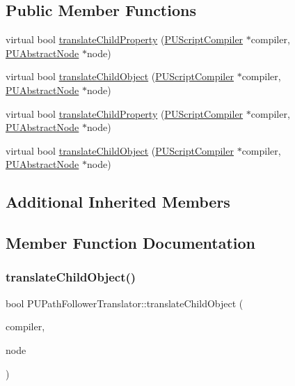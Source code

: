 \subsection*{Public Member Functions}
\begin{DoxyCompactItemize}
\item 
virtual bool \hyperlink{classPUPathFollowerTranslator_a586fc96a69d8ec7915960b1cdb4e35e2}{translate\+Child\+Property} (\hyperlink{classPUScriptCompiler}{P\+U\+Script\+Compiler} $\ast$compiler, \hyperlink{classPUAbstractNode}{P\+U\+Abstract\+Node} $\ast$node)
\item 
virtual bool \hyperlink{classPUPathFollowerTranslator_a13efff0a2d095b443d6fe967d4eb8d96}{translate\+Child\+Object} (\hyperlink{classPUScriptCompiler}{P\+U\+Script\+Compiler} $\ast$compiler, \hyperlink{classPUAbstractNode}{P\+U\+Abstract\+Node} $\ast$node)
\item 
virtual bool \hyperlink{classPUPathFollowerTranslator_a5628c773dc8c5a80074467e4237e4760}{translate\+Child\+Property} (\hyperlink{classPUScriptCompiler}{P\+U\+Script\+Compiler} $\ast$compiler, \hyperlink{classPUAbstractNode}{P\+U\+Abstract\+Node} $\ast$node)
\item 
virtual bool \hyperlink{classPUPathFollowerTranslator_a6ed9a908748902c9e33d3b87673de713}{translate\+Child\+Object} (\hyperlink{classPUScriptCompiler}{P\+U\+Script\+Compiler} $\ast$compiler, \hyperlink{classPUAbstractNode}{P\+U\+Abstract\+Node} $\ast$node)
\end{DoxyCompactItemize}
\subsection*{Additional Inherited Members}


\subsection{Member Function Documentation}
\mbox{\label{classPUPathFollowerTranslator_a13efff0a2d095b443d6fe967d4eb8d96}} 
\subsubsection{\texorpdfstring{translate\+Child\+Object()}{translateChildObject()}\hspace{0.1cm}{\footnotesize\ttfamily [1/2]}}
{\footnotesize\ttfamily bool P\+U\+Path\+Follower\+Translator\+::translate\+Child\+Object (\begin{DoxyParamCaption}\item[{\hyperlink{classPUScriptCompiler}{P\+U\+Script\+Compiler} $\ast$}]{compiler,  }\item[{\hyperlink{classPUAbstractNode}{P\+U\+Abstract\+Node} $\ast$}]{node }\end{DoxyParamCaption})\hspace{0.3cm}{\ttfamily [virtual]}}

